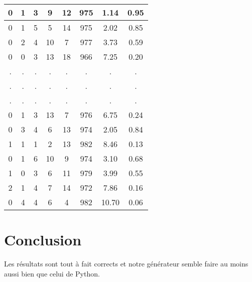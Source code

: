 \documentclass[12pt,a4paper]{article}
\begin{document}
\begin{center}
\begin{tabular}{|c|c|c|c|c|c|c|c|}
0 & 1 & 3 & 9 & 12 & 975 &  1.14 &  0.95\\ \hline
0 & 1 & 5 & 5 & 14 & 975 &  2.02 &  0.85\\ \hline
0 & 2 & 4 & 10 & 7 & 977 &  3.73 &  0.59\\ \hline
0 & 0 & 3 & 13 & 18 & 966 &  7.25 &  0.20\\ \hline
 . & . & . & . & . & . & . & .\\ \hline
 . & . & . & . & . & . & . & .\\ \hline
 . & . & . & . & . & . & . & .\\ \hline
0 & 1 & 3 & 13 & 7 & 976 &  6.75 &  0.24\\ \hline
0 & 3 & 4 & 6 & 13 & 974 &  2.05 &  0.84\\ \hline
1 & 1 & 1 & 2 & 13 & 982 &  8.46 &  0.13\\ \hline
0 & 1 & 6 & 10 & 9 & 974 &  3.10 &  0.68\\ \hline
1 & 0 & 3 & 6 & 11 & 979 &  3.99 &  0.55\\ \hline
2 & 1 & 4 & 7 & 14 & 972 &  7.86 &  0.16\\ \hline
0 & 4 & 4 & 6 & 4 & 982 & 10.70 &  0.06\\ \hline
\end{tabular}
\end{center}


\section{Conclusion}
Les résultats sont tout à fait corrects et notre générateur semble faire
au moins aussi bien que celui de Python.
\end{document}
